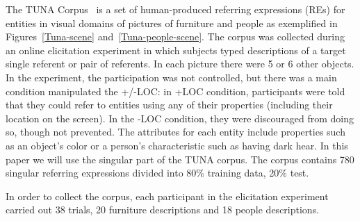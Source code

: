 \label{tunaDescription}The TUNA Corpus~\cite{gatt-balz-kow:2008:ENLG} is a set of human-produced referring expressions (REs) for entities in visual domains of pictures of furniture and people as exemplified in Figures~\ref{Tuna-scene} and~\ref{Tuna-people-scene}. The corpus was
collected during an online elicitation experiment in which subjects typed descriptions of a target single referent or pair of referents. 
In each picture there were 5 or 6 other objects. 
In the experiment, the participation was not controlled, but there was a main condition manipulated the +/-LOC: in +LOC condition, participants were told that they could refer to entities using any of their properties (including their location on the screen). In the -LOC condition, they were discouraged from doing so, though not prevented. 
The attributes for each entity include properties such as an object's color or a person's characteristic such as having dark hear.
In this paper we will use the singular part of the TUNA corpus. The corpus contains 780 singular referring expressions divided
into 80\% training data, 20\% test. 

In order to collect the corpus, each participant in the elicitation experiment carried out 38 trials, 20 furniture descriptions and 18 people descriptions.  


